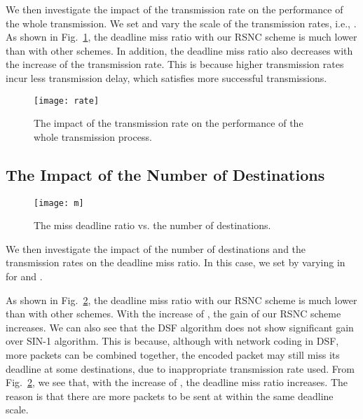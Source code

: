 \documentclass[journal]{IEEEtran}
\begin{document}
We then investigate the impact of the transmission rate on the performance of the whole transmission. We set  and vary the scale of the transmission rates, i.e., . As shown in Fig.~\ref{sim.rate}, the deadline miss ratio with our RSNC scheme is much lower than with other schemes. In addition, the deadline miss ratio also decreases with the increase of the transmission rate. This is because higher transmission rates incur less transmission delay, which satisfies more successful transmissions.
\begin{figure}[t]
\begin{center}\vspace{-0.07in}
\texttt{[image: rate]}\vspace{-0.1in}
\caption{The impact of the transmission rate on the performance of the whole transmission process.}\vspace{-0.15in} \label{sim.rate}
\end{center}\vspace{-0.05in}
\end{figure}

\vspace{-0.12in}
\subsection{The Impact of the Number of Destinations }
\begin{figure}[t]
\begin{center}
\texttt{[image: m]}\vspace{-0.08in}
\caption{The miss deadline ratio vs. the number of destinations.}\vspace{-0.15in} \label{sim.m}
\end{center}\vspace{-0.08in}
\end{figure}

We then investigate the impact of the number of destinations  and the transmission rates on the deadline miss ratio. In this case, we set  by varying  in  for  and .

As shown in Fig.~\ref{sim.m}, the deadline miss ratio with our RSNC scheme is much lower than with other schemes. With the increase of , the gain of our RSNC scheme increases. We can also see that the DSF algorithm does not show significant gain over SIN-1 algorithm. This is because, although with network coding in DSF, more packets can be combined together, the encoded packet may still miss its deadline at some destinations, due to inappropriate transmission rate used. From Fig.~\ref{sim.m}, we see that, with the increase of , the deadline miss ratio increases. The reason is that there are more packets to be sent at  within the same deadline scale.
\vspace{-0.12in}
\end{document}
